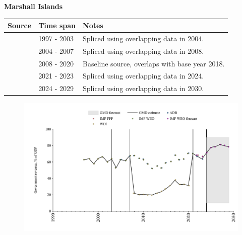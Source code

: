\documentclass[12pt,a4paper,landscape]{article}
\begin{document}
\begin{adjustbox}{max totalsize={\paperwidth}{\paperheight},center}
\begin{minipage}[t][\textheight][t]{\textwidth}
\vspace*{0.5cm}
{}
\begin{center}
{\Large\bfseries Marshall Islands}
\end{center}
\vspace{0.5cm}
\begin{table}[H]
\centering
\small
\begin{tabular}{|l|l|l|}
\hline
\textbf{Source} & \textbf{Time span} & \textbf{Notes} \\
\hline
\rowcolor{white}\cite{IMF_WEO}& 1997 - 2003 &Spliced using overlapping data in 2004.\\
\rowcolor{lightgray}\cite{ADB}& 2004 - 2007 &Spliced using overlapping data in 2008.\\
\rowcolor{white}\cite{WDI}& 2008 - 2020 &Baseline source, overlaps with base year 2018.\\
\rowcolor{lightgray}\cite{ADB}& 2021 - 2023 &Spliced using overlapping data in 2024.\\
\rowcolor{white}\cite{IMF_WEO_forecast}& 2024 - 2029 &Spliced using overlapping data in 2030.\\
\hline
\end{tabular}
\end{table}
\begin{figure}[H]
\centering
\includegraphics[width=\textwidth,height=0.6\textheight,keepaspectratio]{graphs/MHL_govrev_GDP.pdf}
\end{figure}
\end{minipage}
\end{adjustbox}
\end{document}

